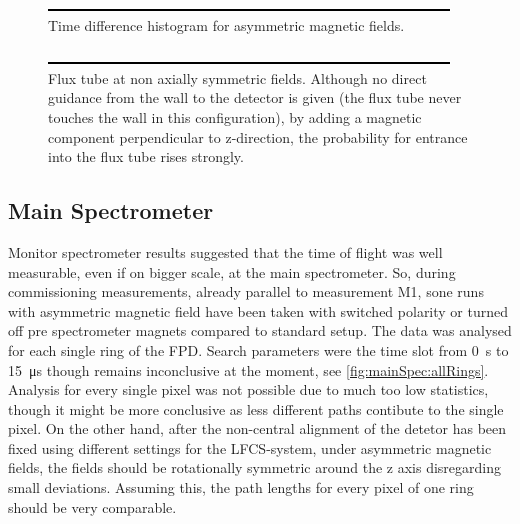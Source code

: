   \begin{figure}
	\label{fig:monSpec:timeDifferences asymmetric magnetic field}
	\caption[Time difference histogram]{Time difference histogram for asymmetric magnetic fields.}
  	\includegraphics{graphics/dummy.eps}
  \end{figure}
  
  \begin{figure}
	\label{fig:monSpec:timeDifferences non axially symmetric magnetic field}
	\caption[Non-axially symmetric magnetic flux tube monitor spectrometer]{Flux tube at non axially symmetric fields. Although no direct guidance from the wall to the detector is given (the flux tube never touches the wall in this configuration), by adding a magnetic component perpendicular to z-direction, the probability for entrance into the flux tube rises strongly.}
  	\includegraphics{graphics/dummy.eps}
  \end{figure}  
  \subsection{Main Spectrometer}
  \label{ch:Analysis:sec:Monitor Spectrometer Measurements:subsec:Main Spectrometer}
  
  Monitor spectrometer results suggested that the time of flight was well measurable, even if on bigger scale, at the main spectrometer. So, during commissioning measurements, already parallel to measurement M1, sone runs with asymmetric magnetic field have been taken with switched polarity or turned off pre spectrometer magnets compared to standard setup.
  The data was analysed for each single ring of the FPD. Search parameters were the time slot from \SI{0}{\second} to \SI{15}{\micro\second} though remains inconclusive at the moment, see \ref{fig:mainSpec:allRings}. Analysis for every single pixel was not possible due to much too low statistics, though it might be more conclusive as less different paths contibute to the single pixel. On the other hand, after the non-central alignment of the detetor has been fixed using different settings for the LFCS-system, under asymmetric magnetic fields, the fields should be rotationally symmetric around the z axis disregarding small deviations. Assuming this, the path lengths for every pixel of one ring should be very comparable.
  
